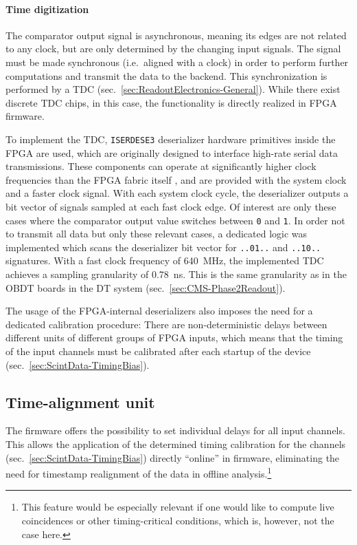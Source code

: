 \paragraph{Time digitization}
The comparator output signal is asynchronous, meaning its edges are not related to any clock, but are only determined by the changing input signals. The signal must be made synchronous (i.e.\ aligned with a clock) in order to perform further computations and transmit the data to the backend. This synchronization is performed by a \ac{TDC} (sec.\ \ref{sec:ReadoutElectronics-General}). While there exist discrete \ac{TDC} chips, in this case, the functionality is directly realized in \ac{FPGA} firmware.
\par To implement the \ac{TDC}, \texttt{ISERDESE3} deserializer hardware primitives \cite{UltraScale-FPGA-SelectIO-Resources} inside the \ac{FPGA} are used, which are originally designed to interface high-rate serial data transmissions. These components can operate at significantly higher clock frequencies than the \ac{FPGA} fabric itself \cite{UltraScale-FPGA-SelectIO-Resources}, and are provided with the system clock and a faster clock signal. With each system clock cycle, the deserializer outputs a bit vector of signals sampled at each fast clock edge. Of interest are only these cases where the comparator output value switches between \texttt{0} and \texttt{1}. In order not to transmit all data but only these relevant cases, a dedicated logic was implemented which scans the deserializer bit vector for \texttt{..01..} and \texttt{..10..} signatures. With a fast clock frequency of \SI{640}{\mega\hertz}, the implemented \ac{TDC} achieves a sampling granularity of \SI{0.78}{\nano\second}. This is the same granularity as in the \ac{OBDT} boards in the \ac{DT} system (sec.\ \ref{sec:CMS-Phase2Readout}).
\par The usage of the \ac{FPGA}-internal deserializers also imposes the need for a dedicated calibration procedure: There are non-deterministic delays between different units of different groups of \ac{FPGA} inputs, which means that the timing of the input channels must be calibrated after each startup of the device (sec.\ \ref{sec:ScintData-TimingBias}).

\subsection{Time-alignment unit}
\label{sec:Scint-ReadoutFirmware-ProgrammableDelays}
The firmware offers the possibility to set individual delays for all input channels. This allows the application of the determined timing calibration for the channels (sec.\ \ref{sec:ScintData-TimingBias}) directly \enquote{online} in firmware, eliminating the need for timestamp realignment of the data in offline analysis.\footnote{This feature would be especially relevant if one would like to compute live coincidences or other timing-critical conditions, which is, however, not the case here.}
